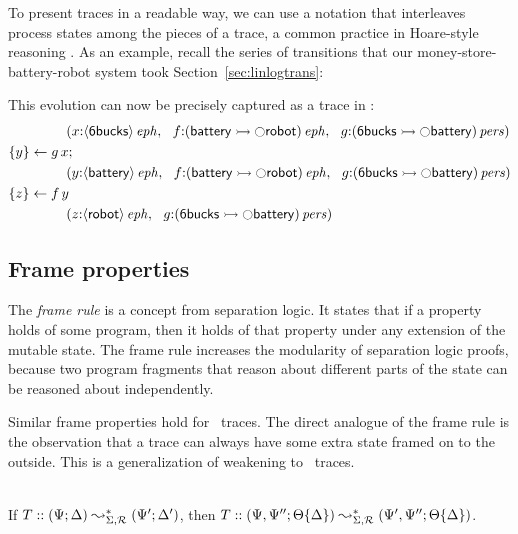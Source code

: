 To present traces in a readable way, we can use a notation that
interleaves process states among the pieces of a trace, a common
practice in Hoare-style reasoning \cite{hoare71proof}.  As an example,
recall the series of transitions that our money-store-battery-robot
system took Section~\ref{sec:linlogtrans}: 
%

%
This evolution can now be precisely captured as a trace in \sls:
\begin{align*}
&\qquad\qquad
\left(
 x{:}{\langle {\sf 6bucks} \rangle}\,{{\it eph}}, ~~
 f{:}{({\sf battery} \rightarrowtail {\ocircle}{\sf robot})}\,{{\it eph}}, ~~
 g{:}{({\sf 6bucks} \rightarrowtail {\ocircle}{\sf battery})}\,{{\it pers}}
\right)
\\
&\{{y}\} \leftarrow {g\,x};
\\
&\qquad\qquad
\left(
 y{:}{\langle {\sf battery} \rangle}\,{{\it eph}}, ~~
 f{:}{({\sf battery} \rightarrowtail {\ocircle}{\sf robot})}\,{{\it eph}}, ~~
 g{:}{({\sf 6bucks} \rightarrowtail {\ocircle}{\sf battery})}\,{{\it pers}}
\right)
\\
&\{{z}\} \leftarrow {f\,y}
\\
&\qquad\qquad
\left(
 z{:}{\langle {\sf robot} \rangle}\,{{\it eph}}, ~~
 g{:}{({\sf 6bucks} \rightarrowtail {\ocircle}{\sf battery})}\,{{\it pers}}
\right)
\end{align*}

\subsection{Frame properties}

The {\it frame rule} is a concept from separation logic.  It
states that if a property holds of some program, then it holds of that
property under any extension of the mutable state. The frame rule
increases the modularity of separation logic proofs, because two
program fragments that reason about different parts of the state can
be reasoned about independently. 

Similar frame properties hold for \sls~traces. The direct analogue of
the frame rule is the observation that a trace can always have some
extra state framed on to the outside. This is a generalization of
weakening to \sls~traces.

\bigskip
\begin{theorem}\label{thm:frameweak}~\\
If $T :: (\Psi; \Delta) \leadsto^*_{\Sigma, \mathcal R} (\Psi'; \Delta')$, then
$T :: (\Psi, \Psi''; {\Theta}\{{\Delta}\})
       \leadsto^*_{\Sigma, \mathcal R} (\Psi', \Psi''; {\Theta}\{{\Delta}\})$.
\end{theorem}
\bigskip

